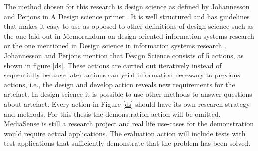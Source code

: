 The method chosen for this research is design science as defined by Johannesson and Perjons in A Design science primer \cite{johannesson2012design}. It is well structured and has guidelines that makes it easy to use as opposed to other definitions of design science such as the one laid out in Memorandum on design-oriented information systems research \cite{osterle2010memorandum} or the one mentioned in Design science in information systems research \cite{hevner2004design}. Johannesson and Perjons mention that Design Science consists of 5 actions, as shown in figure \ref{ds}. These actions are carried out iteratively instead of sequentially because later actions can yeild information necessary to previous actions, i.e., the design and develop action reveals new requirements for the artefact. In design science it is possible to use other methods to answer questions about artefact. Every action in Figure \ref{ds} should have its own research strategy and methods. For this thesis the demonstration action will be omitted. MediaSense is still a research project and real life use-cases for the demonstration would require actual applications. The evaluation action will include tests with test applications that sufficiently demonstrate that the problem has been solved.






